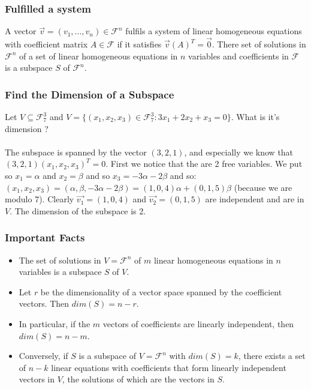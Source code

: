 \documentclass{article}
\begin{document}
\subsubsection{Fulfilled a system}
A vector $ \vec{v} = (v_1,...,v_n) \in \mathcal{F}^n $ fulfils a system of linear homogeneous equations with coefficient matrix $ A \in \mathcal{F} $ if it satisfies $ \vec{v}(A)^T = \vec{0} $.
There set of solutions in $ \mathcal{F}^n $ of a set of linear homogeneous equations in $ n $ variables and coefficients in $ \mathcal{F} $ is a subspace $ S $ of $ \mathcal{F}^n $.

\subsubsection{Find the Dimension of a Subspace} Let $ V \subseteq \mathcal{F}_{7}^{3} $ and $ V = \{(x_1,x_2,x_3) \in \mathcal{F}_{7}^{3}: 3x_1 + 2x_2 + x_3 = 0\} $. What is it's dimension ?
\\
\\
The subspace is spanned by the vector $ (3,2,1) $, and especially we know that $ (3,2,1)(x_1,x_2,x_3)^T = 0 $. First we notice that the are 2 free variables. We put so $ x_1 = \alpha $ and $ x_2 = \beta $ and so $ x_3 = -3\alpha - 2\beta $ and so: $ (x_1,x_2,x_3) = (\alpha, \beta, -3\alpha - 2\beta) = (1,0,4)\alpha + (0,1,5)\beta $ (because we are modulo 7). Clearly $ \vec{v_1} = (1,0,4) $ and $ \vec{v_2} = (0,1,5) $ are independent and are in $ V $. The dimension of the subspace is 2. 

\subsubsection{Important Facts}
\begin{itemize}
\item The set of solutions in $ V = \mathcal{F}^{n} $ of $ m $ linear homogeneous equations in $ n $ variables is a subspace $ S $ of $ V $.
\item Let $ r $ be the dimensionality of a vector space spanned by the coefficient vectors. Then $ dim(S) = n - r $.
\item In particular, if the $ m $ vectors of coefficients are linearly independent, then $ dim(S) = n - m $.
\item Conversely, if $ S $ is a subspace of $ V = \mathcal{F}^{n} $ with $ dim(S) = k $, there exists a set of $ n - k $ linear equations with coefficients that form linearly independent vectors in $ V $, the solutions of which are the vectors in $ S $. 
\end{itemize}
\end{document}
